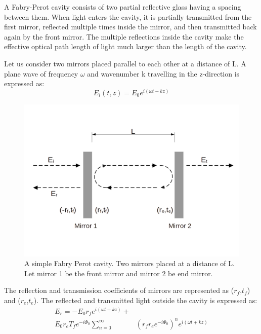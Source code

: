 \documentclass[conference]{IEEEtran}
\begin{document}
A Fabry-Perot cavity consists of two partial reflective glass having a spacing between them. When light enters the cavity, it is partially transmitted from the first mirror, reflected multiple times inside the mirror, and then transmitted back again by the front mirror. The multiple reflections inside the cavity make the effective optical path length of light much larger than the length of the cavity\cite{article6}.

Let us consider two mirrors placed parallel to each other at a distance of L. A plane wave of frequency $\omega$ and wavenumber k travelling in the z-direction is expressed as:
\begin{equation}
E_i{(t,z)}=E_0e^{i(\omega t-kz)}    
\end{equation}

\begin{figure}[htbp]
\centerline{\includegraphics[scale=0.17]{fabry.png}}
\caption{A simple Fabry Perot cavity. Two mirrors placed at a distance of L. Let mirror 1 be the front mirror and mirror 2 be end mirror.}

\end{figure}
The reflection and transmission coefficients of mirrors are represented as ($r_f$,$t_f$) and ($r_e$,$t_e$). The reflected and transmitted light outside the cavity is expressed as:
\begin{equation*}
\begin{aligned}
E_r=-E_0r_fe^{i(\omega t+kz)}+ &\\  E_0r_eT_fe^{-i\Phi_0}\sum_{n=0}^{\infty}&(r_fr_ee^{-i\Phi_0})^n e^{i(\omega t+kz)} 
\end{aligned}
\end{equation*}
\end{document}
